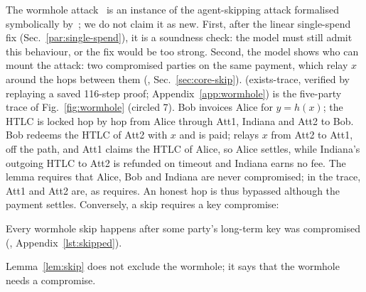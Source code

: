 The wormhole attack~\cite{malavolta2019} is an instance of the agent-skipping attack formalised
symbolically by~\cite{smith2022}; we do not claim it as new. First, after the linear
single-spend fix (Sec.~\ref{par:single-spend}), it is a soundness check: the model must still
admit this behaviour, or the fix would be too strong. Second, the model shows who can mount the
attack: two compromised parties on the same payment, which relay $x$ around the hops between
them (, Sec.~\ref{sec:core-skip}).  (exists-trace, verified by
replaying a saved 116-step proof; Appendix~\ref{app:wormhole}) is the five-party trace of
Fig.~\ref{fig:wormhole} (circled 7). Bob invoices Alice for $y = h(x)$; the HTLC is locked hop by
hop from Alice through Att1, Indiana and Att2 to Bob. Bob redeems the HTLC of Att2 with $x$ and
is paid;  relays $x$ from Att2 to Att1, off the path, and Att1 claims the
HTLC of Alice, so Alice settles, while Indiana's outgoing HTLC to Att2 is refunded on timeout and
Indiana earns no fee. The lemma requires that Alice, Bob and Indiana are never compromised; in
the trace, Att1 and Att2 are, as  requires. An honest hop is thus bypassed
although the payment settles. Conversely, a skip requires a key compromise:

\begin{lemma}\label{lem:skip}
Every wormhole skip happens after some party's long-term key was compromised
(, Appendix~\ref{lst:skipped}).
\end{lemma}
\noindent Lemma~\ref{lem:skip} does not exclude the wormhole; it says that the wormhole needs a
compromise.
